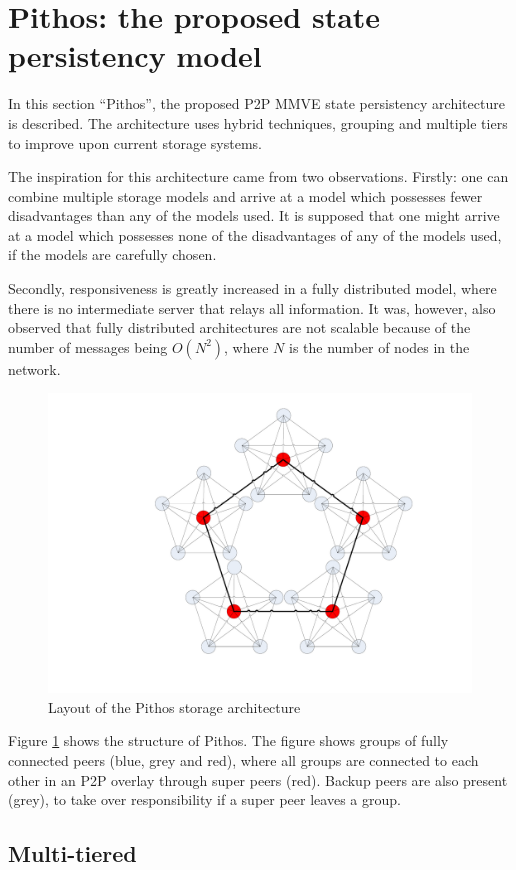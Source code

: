 \documentclass[10pt,a4paper,conference]{IEEEtran}
\begin{document}
\section{Pithos: the proposed state persistency model}
\label{proposed_model}

In this section ``Pithos'', the proposed P2P MMVE state persistency architecture is described. The architecture uses hybrid techniques, grouping and
multiple tiers to improve upon current storage systems.

The inspiration for this architecture came from two observations. Firstly: one can combine multiple storage models and arrive at a model which
possesses fewer disadvantages than any of the models used. It is supposed that one might arrive at a model which possesses none of the disadvantages
of any of the models used, if the models are carefully chosen.

Secondly, responsiveness is greatly increased in a fully distributed model, where there is no intermediate server that relays all information. It
was, however, also observed that fully distributed architectures are not scalable because of the number of messages being $O(N^2)$, where $N$ is the
number of nodes in the network.

\begin{figure}[htbp]
 \centering
 \includegraphics[clip=true, viewport=7.5cm 2.5cm 26cm 20cm, width=0.7\columnwidth]{CDHT_layout}
 \caption{Layout of the Pithos storage architecture}
 \label{fig_pithos}
\end{figure}
%
Figure \ref{fig_pithos} shows the structure of Pithos. The figure shows groups of fully connected peers (blue, grey and red), where all groups are
connected to each other in an P2P overlay through super peers (red). Backup peers are also present (grey), to take over responsibility if a super
peer leaves a group.

\subsection{Multi-tiered}
\end{document}
